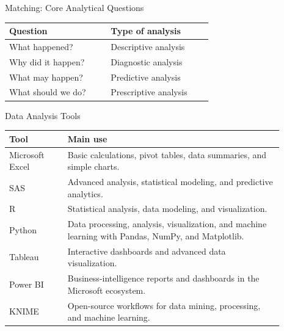 \documentclass[aspectratio=169,11pt]{beamer}
\begin{document}
\begin{frame}{Matching: Core Analytical Questions}
\begin{center}
\begin{tabular}{p{0.42\linewidth}p{0.42\linewidth}}
\toprule
\textbf{Question} & \textbf{Type of analysis}\\
\midrule
What happened? & Descriptive analysis\\
Why did it happen? & Diagnostic analysis\\
What may happen? & Predictive analysis\\
What should we do? & Prescriptive analysis\\
\bottomrule
\end{tabular}
\end{center}
\end{frame}

\begin{frame}{Data Analysis Tools}
\begin{center}\scriptsize
\begin{tabular}{p{0.19\linewidth}p{0.70\linewidth}}
\toprule
\textbf{Tool} & \textbf{Main use}\\
\midrule
Microsoft Excel & Basic calculations, pivot tables, data summaries, and simple charts.\\
SAS & Advanced analysis, statistical modeling, and predictive analytics.\\
R & Statistical analysis, data modeling, and visualization.\\
Python & Data processing, analysis, visualization, and machine learning with Pandas, NumPy, and Matplotlib.\\
Tableau & Interactive dashboards and advanced data visualization.\\
Power BI & Business-intelligence reports and dashboards in the Microsoft ecosystem.\\
KNIME & Open-source workflows for data mining, processing, and machine learning.\\
\bottomrule
\end{tabular}
\end{center}
\end{frame}
\end{document}

